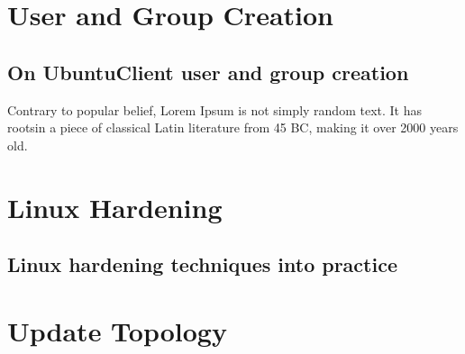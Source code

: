 \documentclass{article}
\begin{document}
	

\section{User and Group Creation}
\label{sec:User and Group CreationID}

	\FloatBarrier
	\subsection{On UbuntuClient user and group creation}
	\label{subsec:On UbuntuClient user and group creationID}

	Contrary to popular belief, Lorem Ipsum is not simply random text. It has rootsin a piece of classical Latin literature from 45 BC, making it over 2000 years old.

\section{Linux Hardening}
\label{sec:Linux HardeningID}

	\FloatBarrier
	\subsection{Linux hardening techniques into practice}
	\label{subsec:Linux hardening techniques into practiceID}

	

\section{Update Topology}
\label{sec:Update TopologyID}
\end{document}
